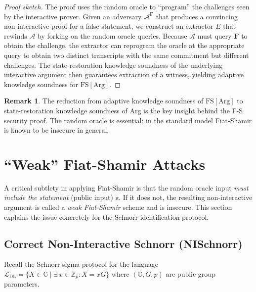 \documentclass[11pt]{article}
\theoremstyle{plain}
\theoremstyle{definition}
\newtheorem{remark}[theorem]{Remark}
\newcommand{\Z}{\mathbb{Z}}
\newcommand{\G}{\mathbb{G}}
\newcommand{\Adv}{\mathcal{A}}
\newcommand{\RO}{\mathbf{F}}   %
\begin{document}
\begin{proof}[Proof sketch]
The proof uses the random oracle to ``program'' the challenges seen by the
interactive prover.  Given an adversary $\Adv^{\RO}$ that produces a convincing
non-interactive proof for a false statement, we construct an extractor $E$ that
rewinds $\Adv$ by forking on the random oracle queries.  Because $\Adv$ must
query $\RO$ to obtain the challenge, the extractor can reprogram the oracle at
the appropriate query to obtain two distinct transcripts with the same
commitment but different challenges.  The state-restoration knowledge soundness
of the underlying interactive argument then guarantees extraction of a witness,
yielding adaptive knowledge soundness for $\mathrm{FS}[\mathrm{Arg}]$.
\end{proof}

\begin{remark}
The reduction from adaptive knowledge soundness of $\mathrm{FS}[\mathrm{Arg}]$
to state-restoration knowledge soundness of $\mathrm{Arg}$ is the key insight
behind the F-S security proof.  The random oracle is essential: in the standard
model Fiat-Shamir is known to be insecure in general.
\end{remark}

\section{``Weak'' Fiat-Shamir Attacks}

A critical subtlety in applying Fiat-Shamir is that the random oracle input
\emph{must include the statement} (public input) $\mathbb{x}$.  If it does not,
the resulting non-interactive argument is called a \emph{weak Fiat-Shamir}
scheme and is insecure.  This section explains the issue concretely for the
Schnorr identification protocol.

\subsection{Correct Non-Interactive Schnorr (NISchnorr)}

Recall the Schnorr sigma protocol for the language
$\mathcal{L}_{\mathrm{DL}} = \{X \in \G \mid \exists\, x \in \Z_p : X = xG\}$
where $(\G, G, p)$ are public group parameters.
\end{document}
